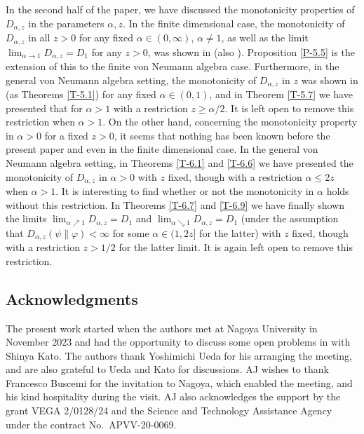 \documentclass[12pt]{article}
\theoremstyle{definition}
\theoremstyle{remark}
\numberwithin{equation}{section}
\def\ffi{\varphi}
\begin{document}
{In the second half of the paper, we have discussed the monotonicity properties of $D_{\alpha,z}$ in the
parameters $\alpha,z$. In the finite dimensional case, the monotonicity of $D_{\alpha,z}$ in all $z>0$ for
any fixed $\alpha\in(0,\infty)$, $\alpha\ne1$, as well as the limit $\lim_{\alpha\to1}D_{\alpha,z}=D_1$ for
any $z>0$, was shown in \cite{lin2015investigating} (also \cite{mosonyi2023somecontinuity}).
Proposition \ref{P-5.5} is the extension of this to the finite von Neumann algebra case. Furthermore,
in the general von Neumann algebra setting, the monotonicity of $D_{\alpha,z}$ in $z$ was shown in
\cite{kato2023onrenyi} (as Theorems \ref{T-5.1}) for any fixed $\alpha\in(0,1)$, and in Theorem \ref{T-5.7}
we have presented that for $\alpha>1$ with a restriction $z\ge\alpha/2$. It is left open to remove this
restriction when $\alpha>1$. On the other hand, concerning the monotonicity property in $\alpha>0$ for
a fixed $z>0$, it seems that nothing has been known before the present paper and
\cite{hiai2024log-majorization} even in the finite dimensional case. In the general von Neumann algebra
setting, in Theorems \ref{T-6.1} and \ref{T-6.6} we have presented the monotonicity of $D_{\alpha,z}$ in
$\alpha>0$ with $z$ fixed, though with a restriction $\alpha\le2z$ when $\alpha>1$. It is interesting to find
whether or not the monotonicity in $\alpha$ holds without this restriction. In Theorems \ref{T-6.7} and
\ref{T-6.9} we have finally shown the limits $\lim_{\alpha\nearrow1}D_{\alpha,z}=D_1$ and
$\lim_{\alpha\searrow1}D_{\alpha,z}=D_1$ (under the assumption that $D_{\alpha,z}(\psi\|\ffi)<\infty$ for
some $\alpha\in(1,2z]$ for the latter) with $z$ fixed, though with a restriction $z>1/2$ for the latter limit.
It is again left open to remove this restriction.
}

\subsection*{Acknowledgments}

The present work started when the authors met at Nagoya University in November 2023 and had
the opportunity to discuss some open problems in \cite{kato2023onrenyi} with Shinya Kato. The authors
thank Yoshimichi Ueda for his arranging the meeting, and are also grateful to Ueda and Kato for discussions.
AJ wishes to thank Francesco Buscemi for the invitation to Nagoya, which enabled the
meeting,  and his kind hospitality during the visit. AJ also acknowledges the support by
the grant VEGA 2/0128/24 and the  Science and Technology Assistance Agency under the
contract No.\ APVV-20-0069.
\end{document}
